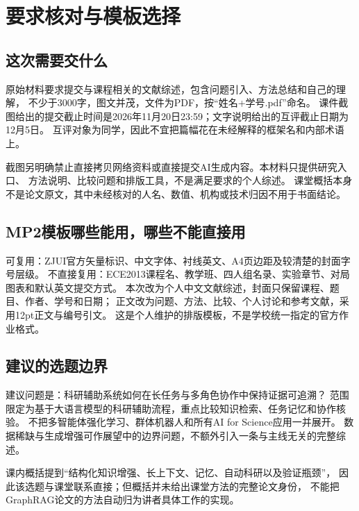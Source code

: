 \documentclass[UTF8,fontset=fandol,12pt,a4paper]{ctexart}
\begin{document}

\section{要求核对与模板选择}
\subsection{这次需要交什么}
原始材料要求提交与课程相关的文献综述，包含问题引入、方法总结和自己的理解，
不少于3000字，图文并茂，文件为PDF，按“姓名+学号.pdf”命名。
课件截图给出的提交截止时间是2026年11月20日23:59；文字说明给出的互评截止日期为12月5日。
互评对象为同学，因此不宜把篇幅花在未经解释的框架名和内部术语上。

截图另明确禁止直接拷贝网络资料或直接提交AI生成内容。本材料只提供研究入口、
方法说明、比较问题和排版工具，不是满足要求的个人综述。
课堂概括本身不是论文原文，其中未经核对的人名、数值、机构或技术归因不用于书面结论。

\subsection{MP2模板哪些能用，哪些不能直接用}
可复用：ZJUI官方矢量标识、中文字体、衬线英文、A4页边距及较清楚的封面字号层级。
不直接复用：ECE2013课程名、教学班、四人组名录、实验章节、对局图表和默认英文提交方式。
本次改为个人中文文献综述，封面只保留课程、题目、作者、学号和日期；
正文改为问题、方法、比较、个人讨论和参考文献，采用12pt正文与编号引文。
这是个人维护的排版模板，不是学校统一指定的官方作业格式。

\subsection{建议的选题边界}
建议问题是：科研辅助系统如何在长任务与多角色协作中保持证据可追溯？
范围限定为基于大语言模型的科研辅助流程，重点比较知识检索、任务记忆和协作核验。
不把多智能体强化学习、群体机器人和所有AI for Science应用一并展开。
数据稀缺与生成增强可作展望中的边界问题，不额外引入一条与主线无关的完整综述。

课内概括提到“结构化知识增强、长上下文、记忆、自动科研以及验证瓶颈”，
因此该选题与课堂联系直接；但概括并未给出课堂方法的完整论文身份，
不能把GraphRAG论文的方法自动归为讲者具体工作的实现。

\clearpage
\end{document}
